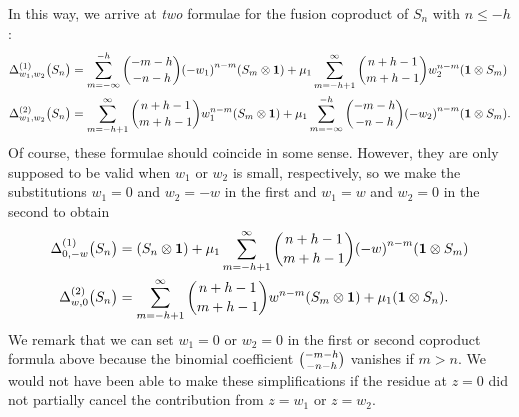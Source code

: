 \documentclass[a4paper,reqno,12pt]{report}
\theoremstyle{definition}
\numberwithin{equation}{section}
\let\originalleft\left     %
\let\originalright\right
\renewcommand{\left}{\mathopen{}\mathclose\bgroup\originalleft}
\renewcommand{\right}{\aftergroup\egroup\originalright}
\newcommand{\brac}[1]{\left( #1 \right)}
\newcommand{\wun}{\mathbf{1}}  %
\newcommand{\coproductsymb}{\Delta}                                                %
\newcommand{\Ncoproductsymb}[1]{\coproductsymb^{(#1)}}                             %
\newcommand{\parNcoproduct}[3]{\Ncoproductsymb{#1}_{#2} \bigl( #3 \bigr)}          %
\renewcommand{\le}{\leqslant}
\theoremstyle{plain}
\begin{document}
In this way, we arrive at \emph{two} formulae for the fusion coproduct of $S_n$ with $n \le -h$:
\begin{subequations}
\begin{align}
\parNcoproduct{1}{w_1,w_2}{S_n} &= \sum_{m=-\infty}^{-h} \binom{-m-h}{-n-h} \brac{-w_1}^{n-m} \brac{S_m \otimes \wun} + \mu_1 \sum_{m=-h+1}^{\infty} \binom{n+h-1}{m+h-1} w_2^{n-m} \brac{\wun \otimes S_m} \\
\parNcoproduct{2}{w_1,w_2}{S_n} &= \sum_{m=-h+1}^{\infty} \binom{n+h-1}{m+h-1} w_1^{n-m} \brac{S_m \otimes \wun} + \mu_1 \sum_{m=-\infty}^{-h} \binom{-m-h}{-n-h} \brac{-w_2}^{n-m} \brac{\wun \otimes S_m}.
\end{align}
\end{subequations}
Of course, these formulae should coincide in some sense.  However, they are only supposed to be valid when $w_1$ or $w_2$ is small, respectively, so we make the substitutions $w_1 = 0$ and $w_2 = -w$ in the first and $w_1 = w$ and $w_2 = 0$ in the second to obtain
\begin{subequations}
\begin{align}
\parNcoproduct{1}{0,-w}{S_n} &= \brac{S_n \otimes \wun} + \mu_1 \sum_{m=-h+1}^{\infty} \binom{n+h-1}{m+h-1} \brac{-w}^{n-m} \brac{\wun \otimes S_m} \\
\parNcoproduct{2}{w,0}{S_n} &= \sum_{m=-h+1}^{\infty} \binom{n+h-1}{m+h-1} w^{n-m} \brac{S_m \otimes \wun} + \mu_1 \brac{\wun \otimes S_n}.
\end{align}
\end{subequations}
We remark that we can set $w_1=0$ or $w_2=0$ in the first or second coproduct formula above because the binomial coefficient $\tbinom{-m-h}{-n-h}$ vanishes if $m>n$.  We would not have been able to make these simplifications if the residue at $z=0$ did not partially cancel the contribution from $z=w_1$ or $z=w_2$.
\end{document}
